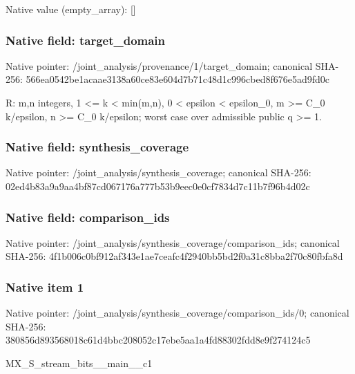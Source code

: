 \documentclass[10pt,a4paper]{article}
\begin{document}
Native value (empty\_\allowbreak{}array): []

\subsubsection{Native field: target\_\allowbreak{}domain}
Native pointer: /joint\_\allowbreak{}analysis/provenance/1/target\_\allowbreak{}domain; canonical SHA-256: 566ea0542be1acaae3138a60ce83e604d7b71c48d1c996cbed8f676e5ad9fd0c

\begingroup\raggedright\sloppy R:\allowbreak{} m,\allowbreak{}n integers,\allowbreak{} 1 <=\allowbreak{} k < min(m,\allowbreak{}n),\allowbreak{} 0 < epsilon < epsilon\_\allowbreak{}0,\allowbreak{} m >=\allowbreak{} C\_\allowbreak{}0 k/\allowbreak{}epsilon,\allowbreak{} n >=\allowbreak{} C\_\allowbreak{}0 k/\allowbreak{}epsilon;\allowbreak{} worst case over admissible public q >=\allowbreak{} 1.\par\endgroup

\subsubsection{Native field: synthesis\_\allowbreak{}coverage}
Native pointer: /joint\_\allowbreak{}analysis/synthesis\_\allowbreak{}coverage; canonical SHA-256: 02ed4b83a9a9aa4bf87cd067176a777b53b9eec0e0cf7834d7c11b7f96b4d02c

\subsubsection{Native field: comparison\_\allowbreak{}ids}
Native pointer: /joint\_\allowbreak{}analysis/synthesis\_\allowbreak{}coverage/comparison\_\allowbreak{}ids; canonical SHA-256: 4f1b006c0bf912af343e1ae7ceafc4f2940bb5bd2f0a31c8bba2f70c80fbfa8d

\subsubsection{Native item 1}
Native pointer: /joint\_\allowbreak{}analysis/synthesis\_\allowbreak{}coverage/comparison\_\allowbreak{}ids/0; canonical SHA-256: 380856d893568018c61d4bbc208052c17ebe5aa1a4fd88302fdd8e9f274124c5

\begingroup\raggedright\sloppy MX\_\allowbreak{}S\_\allowbreak{}stream\_\allowbreak{}bits\_\allowbreak{}\_\allowbreak{}main\_\allowbreak{}\_\allowbreak{}c1\par\endgroup
\end{document}
